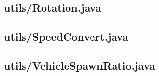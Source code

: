 \subsection{utils/Rotation.java}

\newpage
\subsection{utils/SpeedConvert.java}

\newpage
\subsection{utils/VehicleSpawnRatio.java}

